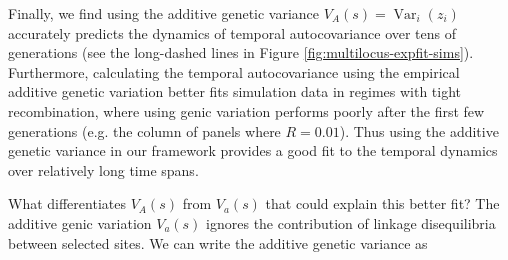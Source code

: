 \documentclass[11pt]{article}
\DeclareMathOperator{\var}{Var}
\begin{document}
Finally, we find using the additive genetic variance $V_A(s) = \var_i(z_i)$
accurately predicts the dynamics of temporal autocovariance over tens of
generations (see the long-dashed lines in Figure
\ref{fig:multilocus-expfit-sims}). Furthermore, calculating the temporal
autocovariance using the empirical additive genetic variation better fits
simulation data in regimes with tight recombination, where using genic
variation performs poorly after the first few generations (e.g. the column of
panels where $R=0.01$). Thus using the additive genetic variance in our
framework provides a good fit to the temporal dynamics over relatively long
time spans.

What differentiates $V_A(s)$ from $V_a(s)$ that could explain this better fit?
The additive genic variation $V_a(s)$ ignores the contribution of linkage
disequilibria between selected sites. We can write the additive genetic
variance as
\end{document}
